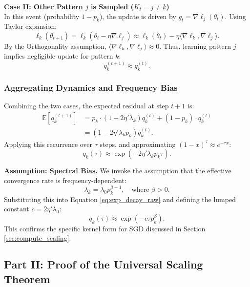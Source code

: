 \documentclass{article}
\theoremstyle{plain}
\theoremstyle{definition}
\theoremstyle{remark}
\begin{document}
\textbf{Case II: Other Pattern $j$ is Sampled ($K_t = j \neq k$)} \\
In this event (probability $1 - p_k$), the update is driven by $g_t = \nabla \ell_j(\theta_t)$. Using Taylor expansion:
\begin{equation*}
    \ell_k(\theta_{t+1}) = \ell_k(\theta_t - \eta \nabla \ell_j) \approx \ell_k(\theta_t) - \eta \langle \nabla \ell_k, \nabla \ell_j \rangle.
\end{equation*}
By the Orthogonality assumption, $\langle \nabla \ell_k, \nabla \ell_j \rangle \approx 0$. Thus, learning pattern $j$ implies negligible update for pattern $k$:
\begin{equation*}
    q_k^{(t+1)} \approx q_k^{(t)}.
\end{equation*}

\subsubsection{Aggregating Dynamics and Frequency Bias}

Combining the two cases, the expected residual at step $t+1$ is:
\begin{align*}
    \mathbb{E}[q_k^{(t+1)}] &= p_k \cdot (1 - 2\eta' \lambda_k) q_k^{(t)} + (1 - p_k) \cdot q_k^{(t)} \\
    &= (1 - 2\eta' \lambda_k p_k) q_k^{(t)}.
\end{align*}
Applying this recurrence over $\tau$ steps, and approximating $(1-x)^\tau \approx e^{-\tau x}$:
\begin{equation*}
    \label{eq:exp_decay_raw}
    q_k(\tau) \approx \exp\left( - 2\eta' \lambda_k p_k \tau \right).
\end{equation*}

\textbf{Assumption: Spectral Bias.} We invoke the assumption that the effective convergence rate is frequency-dependent:
\begin{equation*}
    \lambda_k = \lambda_0 p_k^{\beta-1}, \quad \text{where } \beta > 0.
\end{equation*}
Substituting this into Equation \eqref{eq:exp_decay_raw} and defining the lumped constant $c = 2\eta' \lambda_0$:
\begin{equation*}
    \boxed{ q_k(\tau) \approx \exp\left( - c \tau p_k^\beta \right) }.
\end{equation*}
This confirms the specific kernel form for SGD discussed in Section \ref{sec:compute_scaling}.

\subsection{Part II: Proof of the Universal Scaling Theorem}
\label{app:universality}
\end{document}
